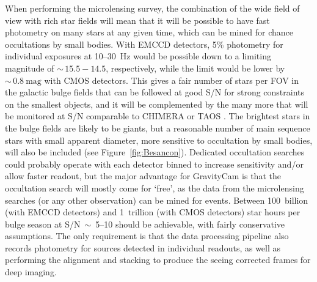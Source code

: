 \documentclass{pasa}%
\begin{document}
When performing the microlensing survey, the combination of the wide field of view with rich star fields will mean that it will be possible to have fast photometry on many stars at any given time, which can be mined for chance occultations by small bodies. %
With EMCCD detectors, 5\% photometry for individual exposures at 10--30~Hz would be possible down to a limiting magnitude of $\sim\,15.5-14.5$, respectively, while the limit would be lower by
$\sim\,0.8~\mbox{mag}$ with CMOS detectors. This gives a fair number of stars per FOV in the galactic bulge fields that can be followed at good S/N for strong constraints on the smallest objects, and it will be complemented by the many more that will be monitored at S/N comparable to CHIMERA \citep{CHIMERA} or TAOS \citep{Alcock2003,Lehner2006}. The brightest stars in the bulge fields are likely to be giants, but a reasonable number of main sequence stars with small apparent diameter, more sensitive to occultation by small bodies, will also be included (see Figure~\ref{fig:Besancon}). Dedicated occultation searches could probably operate with each detector binned to increase sensitivity and/or allow faster readout, but the major advantage for GravityCam is that the occultation search will mostly come for `free', as the data from the microlensing searches (or any other observation) can be mined for events. Between 100~billion (with EMCCD detectors) and 1~trillion (with CMOS detectors) star hours per bulge season at S/N~$\sim$~5--10 should be achievable, with fairly conservative assumptions. The only requirement is that the data processing pipeline also records photometry for sources detected in individual readouts, as well as performing the alignment and stacking to produce the seeing corrected frames for deep imaging.

\end{document}
